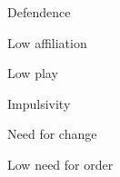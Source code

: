 \documentclass[aspectratio=169]{beamer}
\begin{document}
\begin{frame}
  \begin{center}
    \Huge Defendence
    \\ \small \cite{langford93}
  \end{center}
\end{frame}

\begin{frame}
  \begin{center}
    \Huge Low affiliation
    \\ \small \cite{langford93}
  \end{center}
\end{frame}

\begin{frame}
  \begin{center}
    \Huge Low play
    \\ \small \cite{langford93}
  \end{center}
\end{frame}

\begin{frame}
  \begin{center}
    \Huge Impulsivity
    \\ \small \cite{langford93}
  \end{center}
\end{frame}

\begin{frame}
  \begin{center}
    \Huge Need for change
    \\ \small \cite{langford93}
  \end{center}
\end{frame}

\begin{frame}
  \begin{center}
    \Huge Low need for order
    \\ \small \cite{langford93}
  \end{center}
\end{frame}
\end{document}
